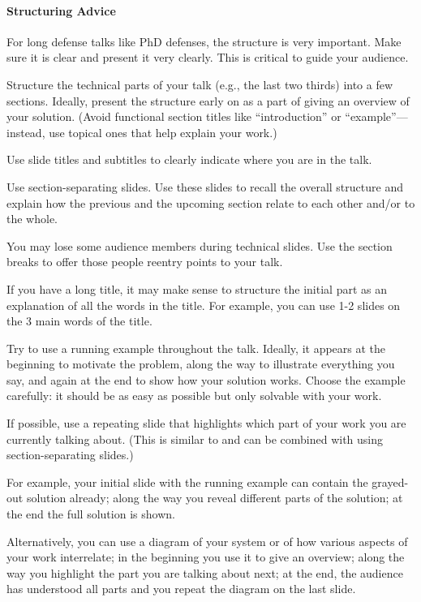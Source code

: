 \documentclass[12pt]{article}
\begin{document}
\paragraph{Structuring Advice}
For long defense talks like PhD defenses, the structure is very important.
Make sure it is clear and present it very clearly.
This is critical to guide your audience.
\begin{compactitem}
\item Structure the technical parts of your talk (e.g., the last two thirds) into a few sections.
 Ideally, present the structure early on as a part of giving an overview of your solution.
 (Avoid functional section titles like ``introduction'' or ``example''---instead, use topical ones that help explain your work.)
\item Use slide titles and subtitles to clearly indicate where you are in the talk. 
\item Use section-separating slides. Use these slides to recall the overall structure and explain how the previous and the upcoming section relate to each other and/or to the whole.
\item You may lose some audience members during technical slides. Use the section breaks to offer those people reentry points to your talk.
\end{compactitem}
\medskip

If you have a long title, it may make sense to structure the initial part as an explanation of all the words in the title.
For example, you can use 1-2 slides on the 3 main words of the title.
\medskip

Try to use a running example throughout the talk.
Ideally, it appears at the beginning to motivate the problem, along the way to illustrate everything you say, and again at the end to show how your solution works.
Choose the example carefully: it should be as easy as possible but only solvable with your work.
\medskip

If possible, use a repeating slide that highlights which part of your work you are currently talking about.
(This is similar to and can be combined with using section-separating slides.)

For example, your initial slide with the running example can contain the grayed-out solution already; along the way you reveal different parts of the solution; at the end the full solution is shown.

Alternatively, you can use a diagram of your system or of how various aspects of your work interrelate; in the beginning you use it to give an overview; along the way you highlight the part you are talking about next; at the end, the audience has understood all parts and you repeat the diagram on the last slide.
\medskip
\end{document}
